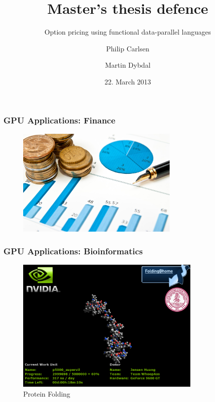 \documentclass{beamer}
\title{Master's thesis defence}
\subtitle{Option pricing using functional data-parallel languages}
\author{Philip Carlsen \and Martin Dybdal}
\date{22. March 2013}
\institute{Computer Science\\
University of Copenhagen}
\begin{document}
\frame{\titlepage}


\begin{frame}
  \frametitle{GPU Applications: Finance}
  \begin{figure}
    \centering
    \includegraphics[width=0.7\textwidth]{graphics/finance.jpg}
\label{fig:gpufinance}
\end{figure}
\end{frame}
\begin{frame}
  \frametitle{GPU Applications: Bioinformatics}
  \begin{figure}
    \centering
    \includegraphics[width=0.8\textwidth]{graphics/fah_clientGeForce9600GT.png}
    \caption{Protein Folding}
\label{fig:foldingathome}
\end{figure}


\end{frame} 
\end{document}
